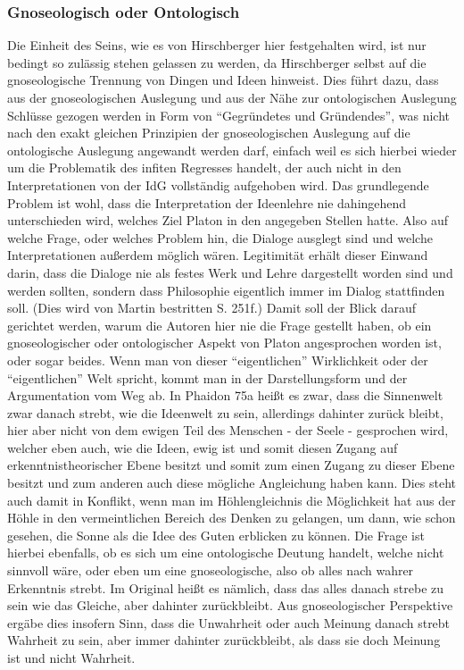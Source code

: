 \subsubsection{Gnoseologisch oder Ontologisch}
Die Einheit des Seins, wie es von Hirschberger hier festgehalten wird, ist nur bedingt so zulässig stehen gelassen zu werden, da Hirschberger selbst auf die gnoseologische Trennung von Dingen und Ideen hinweist. 
Dies führt dazu, dass aus der gnoseologischen Auslegung und aus der Nähe zur ontologischen Auslegung Schlüsse gezogen werden in Form von \enquote{Gegründetes und Gründendes}, was nicht nach den exakt gleichen Prinzipien der gnoseologischen Auslegung auf die ontologische Auslegung angewandt werden darf, einfach weil es sich hierbei wieder um die Problematik des infiten Regresses handelt, der auch nicht in den Interpretationen von der IdG vollständig aufgehoben wird.  
Das grundlegende Problem ist wohl, dass die Interpretation der Ideenlehre nie dahingehend unterschieden wird, welches Ziel Platon in den angegeben Stellen hatte. Also auf welche Frage, oder welches Problem hin, die Dialoge ausglegt sind und welche Interpretationen außerdem möglich wären. Legitimität erhält dieser Einwand darin, dass die Dialoge nie als festes Werk und Lehre dargestellt worden sind und werden sollten, sondern dass Philosophie eigentlich immer im Dialog stattfinden soll. (Dies wird von Martin bestritten S. 251f.) Damit soll der Blick darauf gerichtet werden, warum die Autoren hier nie die Frage gestellt haben, ob ein gnoseologischer oder ontologischer Aspekt von Platon angesprochen worden ist, oder sogar beides.  
Wenn man von dieser \enquote{eigentlichen} Wirklichkeit oder der \enquote{eigentlichen} Welt spricht, kommt man in der Darstellungsform und der Argumentation vom Weg ab. In Phaidon 75a heißt es zwar, dass die Sinnenwelt zwar danach strebt, wie die Ideenwelt zu sein, allerdings dahinter zurück bleibt, hier aber nicht von dem ewigen Teil des Menschen - der Seele - gesprochen wird, welcher eben auch, wie die Ideen, ewig ist und somit diesen Zugang auf erkenntnistheorischer Ebene besitzt und somit zum einen Zugang zu dieser Ebene besitzt und zum anderen auch diese mögliche Angleichung haben kann. Dies steht auch damit in Konflikt, wenn man im Höhlengleichnis die Möglichkeit hat aus der Höhle in den vermeintlichen Bereich des Denken zu gelangen, um dann, wie schon gesehen, die Sonne als die Idee des Guten erblicken zu können. Die Frage ist hierbei ebenfalls, ob es sich um eine ontologische Deutung handelt, welche nicht sinnvoll wäre, oder eben um eine gnoseologische, also ob alles nach wahrer Erkenntnis strebt. Im Original heißt es nämlich, dass das alles danach strebe zu sein wie das Gleiche, aber dahinter zurückbleibt. Aus gnoseologischer Perspektive ergäbe dies insofern Sinn, dass die Unwahrheit oder auch Meinung danach strebt Wahrheit zu sein, aber immer dahinter zurückbleibt, als dass sie doch Meinung ist und nicht Wahrheit. 
